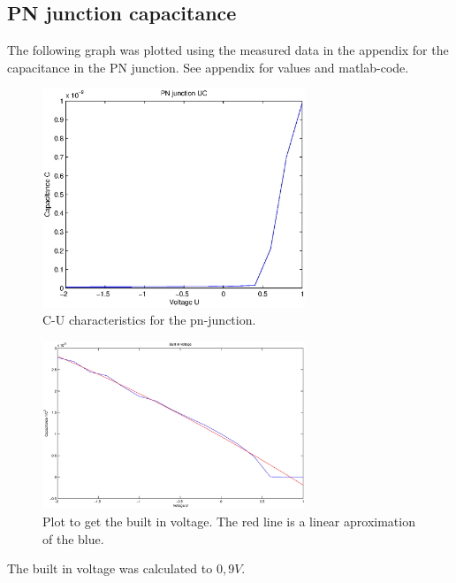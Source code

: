 \documentclass[a4paper]{article}
\begin{document}
\subsection{PN junction capacitance}
The following graph was plotted using the measured data in the appendix for the capacitance in the PN junction. See appendix for values and matlab-code. 
\begin{figure}[H]
	\centering
	\includegraphics[width=0.7\textwidth]{pn_cap.eps}
	\caption{C-U characteristics for the pn-junction.}	
	\label{pn_cap}
\end{figure}
\begin{figure}[H]
	\centering
	\includegraphics[width=0.7\textwidth]{built_in_v.eps}
	\caption{Plot to get the built in voltage. The red line is a linear aproximation of the blue.}
	\label{pn_cap_built_in_v}
\end{figure}

The built in voltage was calculated to $0,9V$.
\end{document}

